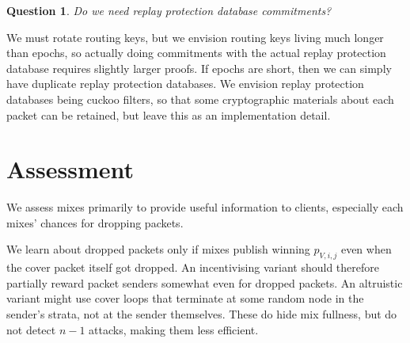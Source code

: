 ﻿\documentclass{sig-alternate-hotpets}
\newtheorem{question}{Question}
\begin{document}
\begin{question}
Do we need replay protection database commitments?
\end{question}

We must rotate routing keys, but we envision routing keys living much longer than epochs, so actually doing commitments with the actual replay protection database requires slightly larger proofs.  If epochs are short, then we can simply have duplicate replay protection databases.  We envision replay protection databases being cuckoo filters, so that some cryptographic materials about each packet can be retained, but leave this as an implementation detail.





\section{Assessment}

We assess mixes primarily to provide useful information to clients,
especially each mixes' chances for dropping packets.

We learn about dropped packets only if mixes publish winning
$p_{V,i,j}$ even when the cover packet itself got dropped.  
An incentivising variant should therefore partially reward packet
senders somewhat even for dropped packets. 
An altruistic variant might use cover loops that terminate at some
random node in the sender's strata, not at the sender themselves.
These do hide mix fullness, but do not detect $n-1$ attacks, making
them less efficient.  
\end{document}
